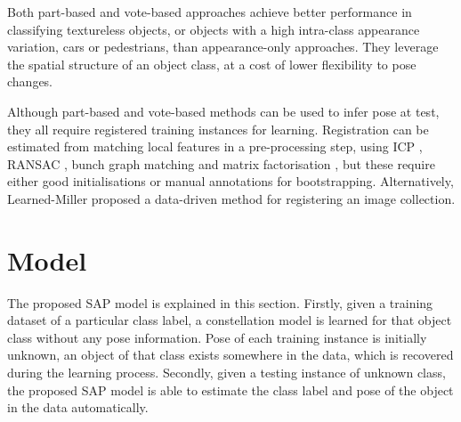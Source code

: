 Both part-based and vote-based approaches achieve better performance in classifying textureless objects, or objects with a high intra-class appearance variation, \eg cars or pedestrians, than appearance-only approaches. They leverage the spatial structure of an object class, at a cost of lower flexibility to pose changes.     





Although part-based and vote-based methods can be used to infer pose at test, they all require registered training instances for learning.  
Registration can be estimated from matching local features in a pre-processing step, using ICP \cite{Pham2011}, RANSAC \cite{Moreels2007}, bunch graph matching \cite{Wiskott1997} and matrix factorisation \cite{Arie-Nachimson2009}, but these require either good initialisations or manual annotations for bootstrapping. Alternatively, Learned-Miller \cite{Learned-Miller2006} proposed a data-driven method for registering an image collection.  

\section{Model}
\label{sec/reg/framework}

The proposed SAP model is explained in this section. 
Firstly, given a training dataset of a particular class label, a constellation model is learned for that object class without any pose information. Pose of each training instance is initially unknown, \ie an object of that class exists somewhere in the data, which is recovered during the learning process.
Secondly, given a testing instance of unknown class, the proposed SAP model is able to estimate the class label and pose of the object in the data automatically. 


